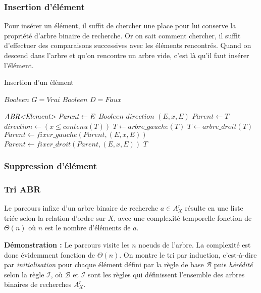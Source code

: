 \documentclass[../../../main.tex]{subfiles}
\begin{document}
\subsubsection{Insertion d'élément}
Pour insérer un élément, il suffit de chercher une place pour lui conserve la propriété d'arbre binaire de recherche. Or on sait comment chercher, il suffit d'effectuer des comparaisons successives avec les éléments rencontrés. Quand on descend dans l'arbre et qu'on rencontre un arbre vide, c'est là qu'il faut insérer l'élément.
\begin{algorithm}
\caption{Insertion d'un élément \label{alg:insertion_abr}}
$\textit{Booleen } G = \textit{Vrai}$ 
$\textit{Booleen } D = \textit{Faux}$ 


$\textit{ABR\textless{}Element\textgreater{} Parent} \leftarrow E$\;
$\textit{Booleen direction}$\;
 {
	\Return $(E, x, E)$\;
}
 {
	$Parent \leftarrow T$\;
	$direction\leftarrow (x\leq contenu(T))$\;
	 {
		$T\leftarrow arbre\_gauche(T)$\;
	} {
		$T\leftarrow arbre\_droit(T)$\;
	}
}
 {
	$Parent \leftarrow fixer\_gauche(Parent, (E, x, E))$\;
} {
	$Parent \leftarrow fixer\_droit(Parent, (E, x, E))$\;
}
\Return $T$ 
\end{algorithm}
\subsubsection{Suppression d'élément}

\subsubsection{Tri ABR}
 Le parcours infixe d'un arbre binaire de recherche $a\in A^r_X$ résulte en une liste triée selon la relation d'ordre sur $X$, avec une complexité temporelle fonction de $\Theta(n)$ où $n$ est le nombre d'éléments de $a$.

\textbf{Démonstration :} Le parcours visite les $n$ noeuds de l'arbre. La complexité est donc évidemment fonction de $\Theta(n)$. On montre le tri par induction, c'est-à-dire par \textit{initialisation} pour chaque élément défini par la règle de base $\mathcal{B}$ puis \textit{hérédité} selon la règle $\mathcal{I}$, où $\mathcal{B}$ et $\mathcal{I}$ sont les règles qui définissent l'ensemble des arbres binaires de recherches $A^r_X$.
\end{document}
